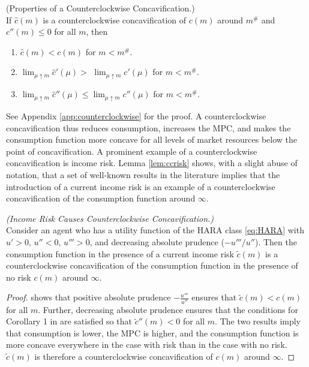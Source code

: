   \begin{lemma}\label{lem:counterclockwise}(Properties of a Counterclockwise Concavification.) \\
    If $\hat{c}({m})$ is a counterclockwise concavification of $c({m})$ around ${m}^{\#}$ and $c''({m}) \leq 0$ for all ${m}$, then
    \begin{enumerate}
    \item $\hat{c}({m}) < c({m})$ for  ${m} < {m}^{\#}$.
    \item $\lim_{\mu \uparrow {m}} \hat{c}'(\mu) >$ $\lim_{\mu \uparrow {m}} c'(\mu)$ for ${m} < {m}^{\#}$.
    \item $\lim_{\mu \uparrow {m}} \hat{c}''(\mu) \leq \lim_{\mu \uparrow {m}} c''(\mu)$ for ${m} < {m}^{\#}$.
    \end{enumerate}
  \end{lemma}
  \noindent See Appendix \ref{app:counterclockwise} for the proof. A counterclockwise concavification thus reduces consumption, increases the MPC, and makes the consumption function more concave for all levels of market resources below the point of concavification. A prominent example of a counterclockwise concavification is income risk. Lemma \ref{lem:ccrisk} shows, with a slight abuse of notation, that a set of well-known results in the literature implies that the introduction of a current income risk is an example of a counterclockwise concavification of the consumption function around $\infty$.

  \begin{lemma}\label{lem:ccrisk}\textit{(Income Risk Causes Counterclockwise Concavification.)} \\
    Consider an agent who has a utility function of the HARA class \eqref{eq:HARA}
    with $u' > 0$, $u'' < 0$, $u''' > 0$, and decreasing absolute prudence ($-u'''/u''$). Then the consumption function in the presence of a current income risk $\tilde{c}({m})$ is a counterclockwise concavification of the consumption function in the presence of no risk $c({m})$ around $\infty$.
  \end{lemma}
  \begin{proof}
    \citet{kimball:smallandlarge} shows that positive absolute prudence $-\frac{u'''}{u''}$ ensures that $\tilde{c}({m}) < c({m})$ for all ${m}$. Further, decreasing absolute prudence ensures that the conditions for Corollary 1 in \citet{carroll&kimball:concavity} are satisfied so that $\tilde{c}''({m}) < 0$ for all ${m}$. The two results imply that consumption is lower, the MPC is higher, and the consumption function is more concave everywhere in the case with risk than in the case with no risk. $\tilde{c}({m})$ is therefore a counterclockwise concavification of $c({m})$ around $\infty$.
  \end{proof}

